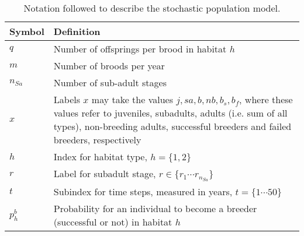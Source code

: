 \begin{table}
\caption[Notation]{Notation followed to describe the stochastic population model.}\label{tab:tabApp3.1.1}
\begin{tabular}[b]{@{}p{1.5cm}p{13cm}@{}}
\toprule
\textbf{Symbol} & \textbf{Definition}                                                                                                                                                                                             \\ \midrule
$q$   & Number of offsprings per brood in habitat $h$                                                                                                                                                                             \\
$m$   & Number of broods per year                                                                                                                                                                                                 \\
${n}_{Sa}$        & Number of sub-adult stages                                                                                                                                                                                    \\
$x$   & Labels $x$ may take the values $j, sa, b, nb, b_{s}, b_{f}$, where these values refer to juveniles, subadults, adults (i.e. sum of all types), non-breeding adults, successful breeders and failed breeders, respectively \\
$h$   & Index for habitat type, $h=\{1, 2\}$                                                                                                                                                                                      \\
$r$   & Label for subadult stage, $r \in \{r_{1} \cdots r_{n_{Sa}}\}$                                                                                                                                                             \\
$t$   & Subindex for time steps, measured in years, $t= \{1 \cdots 50\}$                                                                                                                                                          \\
${p}_{h}^{b}$     & Probability for an individual to become a breeder (successful or not) in habitat $h$                                                                                                                          \\

\end{tabular}
\end{table}
